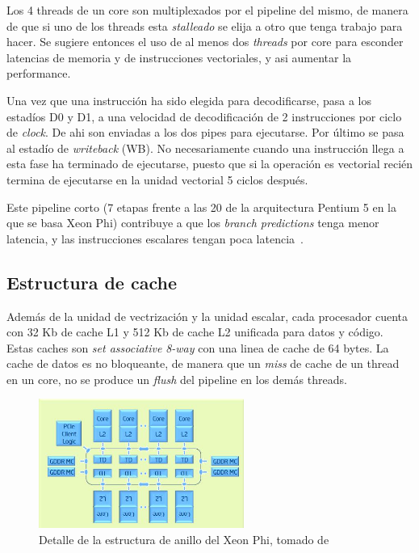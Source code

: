 Los 4 threads de un core son multiplexados por el pipeline del mismo, de manera de que si uno de los threads esta
\textit{stalleado} se elija a otro que tenga trabajo para hacer. Se sugiere entonces el uso de al menos dos 
\textit{threads} por core para esconder latencias de memoria y de instrucciones vectoriales, y asi aumentar la performance.

Una vez que una instrucci\'on ha sido elegida para decodificarse, pasa a los estad\'ios D0 y D1, a una velocidad de
decodificaci\'on de 2 instrucciones por ciclo de \textit{clock}. De ahi son enviadas a los dos pipes para ejecutarse.
Por \'ultimo se pasa al estad\'io de \textit{writeback} (WB). No necesariamente cuando una instrucci\'on llega a esta
fase ha terminado de ejecutarse, puesto que si la operaci\'on es vectorial reci\'en termina de ejecutarse en la unidad
vectorial 5 ciclos despu\'es.

Este pipeline corto (7 etapas frente a las 20 de la arquitectura Pentium 5 en la que se basa Xeon Phi) contribuye a que
los \textit{branch predictions} tenga menor latencia, y las instrucciones escalares tengan poca latencia~\cite{IntelXeonPhiWhitePaper}.

\subsection{Estructura de cache}

Adem\'as de la unidad de vectrizaci\'on y la unidad escalar, cada procesador cuenta con 32 Kb de cache L1 y 512 Kb de cache
L2 unificada para datos y c\'odigo. Estas caches son \textit{set associative} \textit{8-way} con una linea de cache de 64 bytes. 
La cache de datos es no bloqueante, de manera que un \textit{miss} de cache de un thread en un core, 
no se produce un \textit{flush} del pipeline en los dem\'as threads.

\begin{figure}[htbp]
   \centering
   \includegraphics[width=0.6\textwidth]{images/xeon-phi-ring.jpg}
   \caption{Detalle de la estructura de anillo del Xeon Phi, tomado de~\cite{XeonPhiArchArticle}}
   \label{fig::xeon_phi_arch_global}
\end{figure}

